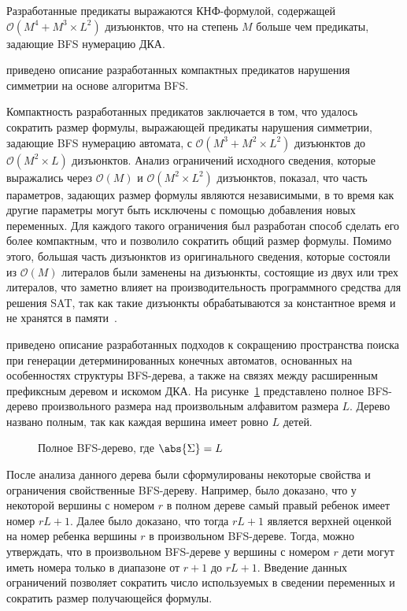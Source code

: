 Разработанные предикаты выражаются КНФ-формулой, содержащей $\mathcal{O}\left(M^{4} + M^{3} \times L^{2}\right)$ дизъюнктов, что на степень $M$ больше чем предикаты, задающие BFS нумерацию ДКА.

\insection{\ref{sec:space:tight}} приведено описание разработанных компактных предикатов нарушения симметрии на основе алгоритма BFS.

Компактность разработанных предикатов заключается в том, что удалось сократить размер формулы, выражающей предикаты нарушения симметрии, задающие BFS нумерацию автомата, с $\mathcal{O}\left(M^{3} + M^{2} \times L^{2}\right)$ дизъюнктов до $\mathcal{O}\left(M^{2} \times L\right)$ дизъюнктов.
Анализ ограничений исходного сведения, которые выражались через $\mathcal{O}\left(M\right)$ и $\mathcal{O}\left(M^{2} \times L^{2}\right)$ дизъюнктов, показал, что часть параметров, задающих размер формулы являются независимыми, в то время как другие параметры могут быть исключены с помощью добавления новых переменных. 
Для каждого такого ограничения был разработан способ сделать его более компактным, что и позволило сократить общий размер формулы.
Помимо этого, б\emph{о}льшая часть дизъюнктов из оригинального сведения, которые состояли из $\mathcal{O}\left(M\right)$ литералов
были заменены на дизъюнкты, состоящие из двух или трех литералов, что заметно влияет на производительность программного средства для решения SAT, так как такие дизъюнкты обрабатываются за константное время и не хранятся в памяти~\cite{MSilva-SATbook09}.

\insection{\ref{sec:space:pruning}} приведено описание разработанных подходов к сокращению пространства поиска при генерации детерминированных конечных автоматов, основанных на особенностях структуры BFS-дерева, а также на связях между расширенным префиксным деревом и искомом ДКА.
На рисунке~\ref{syn:img:full-bfs} представлено полное BFS-дерево произвольного размера над произвольным алфавитом размера $L$.
Дерево названо полным, так как каждая вершина имеет ровно $L$ детей.

\begin{figure}[ht]
  \centering
  \scalebox{0.625}{}
  \caption{Полное BFS-дерево, где $\abs{\Sigma}=L$}
  \label{syn:img:full-bfs}
\end{figure}

После анализа данного дерева были сформулированы некоторые свойства и ограничения свойственные BFS-дереву.
Например, было доказано, что у некоторой вершины с номером $r$ в полном дереве самый правый ребенок имеет номер $rL + 1$.
Далее было доказано, что тогда $rL + 1$ является верхней оценкой на номер ребенка вершины $r$ в произвольном BFS-дереве.
Тогда, можно утверждать, что в произвольном BFS-дереве у вершины с номером $r$ дети могут иметь номера только в диапазоне от $r + 1$ до $rL + 1$.
Введение данных ограничений позволяет сократить число используемых в сведении переменных и сократить размер получающейся формулы.

